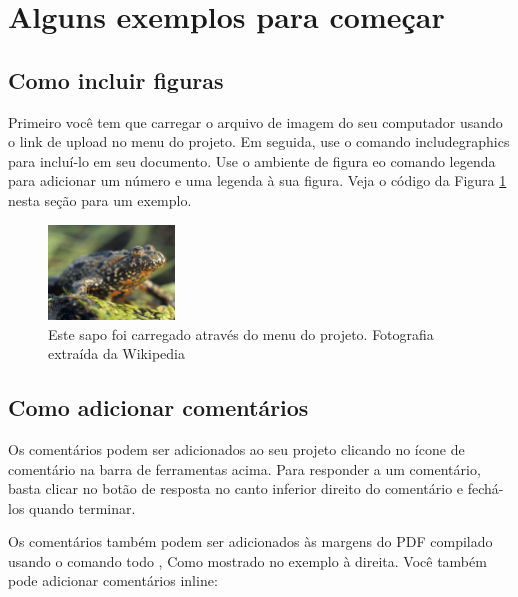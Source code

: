 \documentclass[a4paper]{article}
\begin{document}
\section{Alguns exemplos para começar}

\subsection{Como incluir figuras}

Primeiro você tem que carregar o arquivo de imagem do seu computador usando o link de upload no menu do projeto. Em seguida, use o comando includegraphics para incluí-lo em seu documento. Use o ambiente de figura eo comando legenda para adicionar um número e uma legenda à sua figura. Veja o código da Figura \ref{fig:frog} nesta seção para um exemplo.

\begin{figure}
\centering
\includegraphics[width=0.3\textwidth]{sapo.jpg}
\caption{\label{fig:frog}Este sapo foi carregado através do menu do projeto. Fotografia extraída da Wikipedia~\cite{wiki:sapinho}}
\end{figure}

\subsection{Como adicionar comentários}

Os comentários podem ser adicionados ao seu projeto clicando no ícone de comentário na barra de ferramentas acima. %
%
%
Para responder a um comentário, basta clicar no botão de resposta no canto inferior direito do comentário e fechá-los quando terminar.

Os comentários também podem ser adicionados às margens do PDF compilado usando o comando todo , Como mostrado no exemplo à direita. Você também pode adicionar comentários inline:

\end{document}

